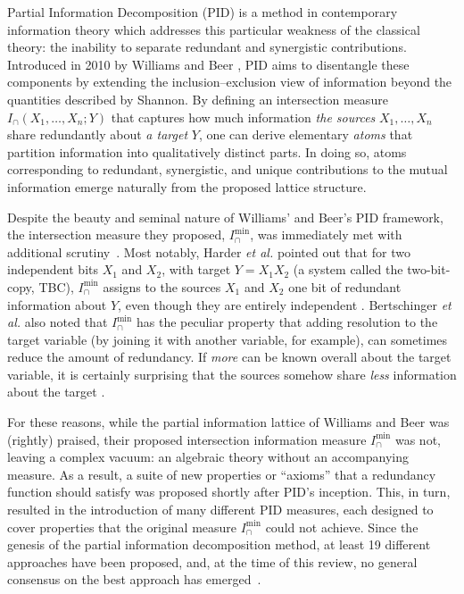 \documentclass{article}
\makeatletter
\newcommand{\etal}{\textit{et al.\@} }
\newcommand{\Imin}{\ensuremath{I_\cap^{\text{min}}}\xspace}
\makeatother
\begin{document}
Partial Information Decomposition (PID) is a method in contemporary information theory which addresses this particular weakness of the classical theory: the inability to separate redundant and synergistic contributions. Introduced in 2010 by Williams and Beer \cite{williams2010nonnegative}, PID aims to disentangle these components by extending the inclusion–exclusion view of information beyond the quantities described by Shannon. By defining an intersection measure $I_{\cap}(X_1, \ldots, X_n;Y)$ that captures how much information \textit{the sources} $X_1,\ldots, X_n$ share redundantly about \textit{a target} $Y$, one can derive elementary \textit{atoms} that partition information into qualitatively distinct parts. In doing so, atoms corresponding to redundant, synergistic, and unique contributions to the mutual information emerge naturally from the proposed lattice structure.

Despite the beauty and seminal nature of Williams' and Beer's PID framework, the intersection measure they proposed, $\Imin$, was immediately met with additional scrutiny~\cite{harder2013bivariate, bertschinger2013shared}. Most notably, Harder \etal pointed out that for two independent bits $X_1$ and $X_2$, with target $Y = X_1X_2$ (a system called the two-bit-copy, TBC), $\Imin$ assigns to the sources $X_1$ and $X_2$ one bit of redundant information about $Y$, even though they are entirely independent \cite{harder2013bivariate}. Bertschinger \etal also noted that $\Imin$ has the peculiar property that adding resolution to the target variable (by joining it with another variable, for example), can sometimes reduce the amount of redundancy. If \textit{more} can be known overall about the target variable, it is certainly surprising that the sources somehow share \textit{less} information about the target \cite{bertschinger2013shared}.

For these reasons, while the partial information lattice of Williams and Beer was (rightly) praised, their proposed intersection information measure $\Imin$ was not, leaving a complex vacuum: an algebraic theory without an accompanying measure. As a result, a suite of new properties or ``axioms'' that a redundancy function should satisfy was proposed shortly after PID's inception. This, in turn, resulted in the introduction of many different PID measures, each designed to cover properties that the original measure $\Imin$ could not achieve. Since the genesis of the partial information decomposition method, at least 19 different approaches have been proposed, and, at the time of this review, no general consensus on the best approach has emerged~\cite{williams2010nonnegative, harder2013bivariate, griffith2014intersection, bertschinger2014quantifying, griffith2014quantifying, griffith2015quantifying, barrett2015exploration, goodwell2017temporal, ince2017measuring, james2018unique, kay2018exact, james2018uniquekey, finn2018pointwise, niu2019measure, kay2024partial, sigtermans2020partial, sigtermans2020towards, makkeh2021introducing, schick2021partial, ehrlich2024partial, kolchinsky2022novel, venkatesh2022partial, mages2023decomposing, lyu2024explicit}.
 
\end{document}
